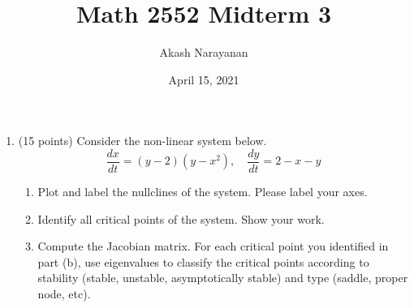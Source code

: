 \documentclass[11pt, titlepage]{article}
\title{Math 2552 Midterm 3}
\author{Akash Narayanan}
\date{April 15, 2021}
\begin{document}
    \maketitle

    \begin{enumerate}
        \item (15 points) Consider the non-linear system below.
            \[
                \frac{dx}{dt} = (y-2)(y-x^2), \quad \frac{dy}{dt} = 2-x-y
            \] 
            \begin{enumerate}[label={(\alph*)}]
                \item Plot and label the nullclines of the system. Please label
                    your axes.
                \item Identify all critical points of the system. Show your
                    work.
                \item Compute the Jacobian matrix. For each critical point you
                    identified in part (b), use eigenvalues to classify the
                    critical points according to stability (stable, unstable,
                    asymptotically stable) and type (saddle, proper node, etc).
            \end{enumerate}


\end{enumerate}
\end{document}
